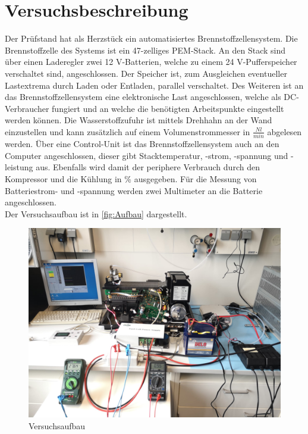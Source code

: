 \section{Versuchsbeschreibung}
\label{section:Versuchsbeschreibung}
Der Prüfstand hat als Herzstück ein automatisiertes Brennstoffzellensystem.
Die Brennstoffzelle des Systems ist ein 47-zelliges PEM-Stack.
An den Stack sind über einen Laderegler zwei 12 V-Batterien, welche zu einem 24 V-Pufferspeicher verschaltet sind, angeschlossen.
Der Speicher ist, zum Ausgleichen eventueller Lastextrema durch Laden oder Entladen, parallel verschaltet.
Des Weiteren ist an das Brennstoffzellensystem eine elektronische Last angeschlossen,
welche als DC-Verbraucher fungiert und an welche die benötigten Arbeitspunkte eingestellt werden können.
Die Wasserstoffzufuhr ist mittels Drehhahn an der Wand einzustellen und kann
zusätzlich auf einem Volumenstrommesser in $\frac{Nl}{min}$ abgelesen werden.
Über eine Control-Unit ist das Brennstoffzellensystem auch an den Computer angeschlossen,
dieser gibt Stacktemperatur, -strom, -spannung und -leistung aus. Ebenfalls wird
damit der periphere Verbrauch durch den Kompressor und die Kühlung in \% ausgegeben.
Für die Messung von Batteriestrom- und -spannung werden zwei Multimeter an die Batterie angeschlossen.\\
Der Versuchsaufbau ist in \autoref{fig:Aufbau} dargestellt.
\begin{figure}[H]
    \centering
    \includegraphics[width=\textwidth]{Abbildungen/Aufbau-Gesamt.jpg}
    \caption{Versuchsaufbau}
    \label{fig:Aufbau}
\end{figure}